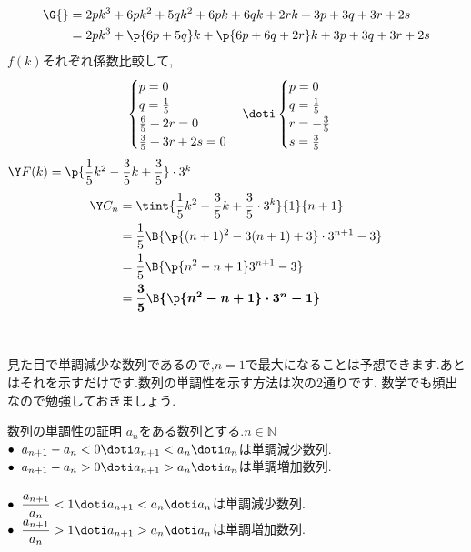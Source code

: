 \documentclass[10pt,fleqn,a4paper]{jsarticle}
\newcommand{\ans}[1]{\mbox{\boldmath{$#1$}}}
\begin{document}
\begin{align*}
  \G{}&=2pk^3+6pk^2+5qk^2+6pk+6qk+2rk+3p+3q+3r+2s\\
  &=2pk^3+\p{6p+5q}k+\p{6p+6q+2r}k+3p+3q+3r+2s
\end{align*}
$f(k)$それぞれ係数比較して,
\begin{align*}
  \begin{cases}
     p=0\\
     q=\frac{1}{5}\\
     \frac{6}{5}+2r=0\\
     \frac{3}{5}+3r+2s=0
  \end{cases}\doti\begin{cases}
    p=0\\
    q=\frac{1}{5}\\
    r=-\frac{3}{5}\\
    s=\frac{3}{5}
  \end{cases}
\end{align*}
$\Y F(k)=\p{\dfrac{1}{5}k^2-\dfrac{3}{5}k+\dfrac{3}{5}}\cdot3^k$
\begin{align*}
  \Y C_n&=\tint{{\dfrac{1}{5}k^2-\dfrac{3}{5}k+\dfrac{3}{5}}\cdot3^k}{1}{n+1}\\
&=\dfrac{1}{5}\B{\p{(n+1)^2-3(n+1)+3}\cdot3^{n+1}-3}\\
&=\dfrac{1}{5}\B{\p{n^2-n+1}3^{n+1}-3}\\
&=\ans{\dfrac{3}{5}\B{\p{n^2-n+1}\cdot3^n-1}}
\end{align*}
\newpage
\noindent{}\\
\kangaekata\\
見た目で単調減少な数列であるので,$n=1$で最大になることは予想できます.あとはそれを示すだけです.数列の単調性を示す方法は次の2通りです.
数学\suIII でも頻出なので勉強しておきましょう.
\begin{itembox}
[l]{\enpitu 数列の単調性の証明}
$a_n$をある数列とする.$n\in\mathbb{N}$\\
$\bullet\hspace{2mm} a_{n+1}-a_n<0\doti  a_{n+1}<a_n\doti a_n$は単調減少数列.\\
$\bullet\hspace{2mm} a_{n+1}-a_n>0\doti a_{n+1}>a_n\doti a_n$は単調増加数列.\\\\
$\bullet\hspace{2mm} \dfrac{a_{n+1}}{a_n}<1\doti a_{n+1}<a_n\doti a_n$は単調減少数列.\\
$\bullet\hspace{2mm} \dfrac{a_{n+1}}{a_n}>1\doti a_{n+1}>a_n\doti a_n$は単調増加数列.
\end{itembox}
\end{document}
